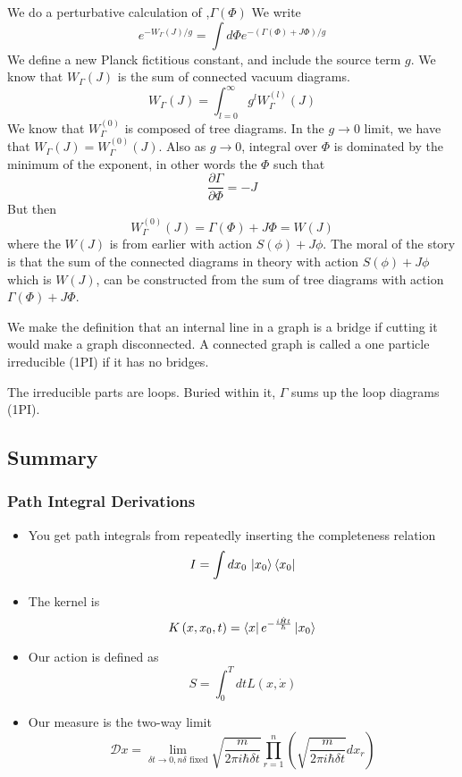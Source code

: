 \documentclass[11pt, oneside]{article}   	%
\theoremstyle{slanted}
\newcommand{\planck}{\hbar}
\begin{document}
We do a perturbative calculation of ,$ \Gamma \left(  \Phi   \right) $
We write 
\[
	e ^{  - W _{ \Gamma } \left( J  \right)   / g }  = \int d \Phi e ^{ 
	- \left( \Gamma \left(  \Phi  \right)   + J \Phi  \right)   / g } 
\] We define a new Planck fictitious constant, 
and include the source term $ g $. 
We know that 
$ W _{ \Gamma } \left(  J  \right)  $ is the 
sum of connected vacuum diagrams. 
\[
	W _{\Gamma }\left( J  \right) 
	= \int_{ l  =0 } ^{ \infty } g ^ l W _{ \Gamma } ^{ \left(  l  \right)   } 
	\left( J  \right) 
\]  We know that 
$ W  _{ \Gamma } ^{ \left(  0  \right)   }$ 
is composed of tree diagrams. 
In the $ g \to 0 $ limit, 
we have that $ W_{ \Gamma } \left( J  \right)    =  W_{ \Gamma } ^{ \left(  0  \right)  } 
\left( J  \right)  $. 
Also as $ g \to 0 $, integral over $ \Phi $ is 
dominated by the minimum of the exponent, 
in other words the $ \Phi $ such that 
\[
 \frac{\partial  \Gamma }{\partial  \Phi }   =  - J 
\]  But then 
\[
	W _{ \Gamma } ^{ \left(  0  \right)  } \left(  J \right)   = 
	\Gamma ( \Phi ) + J \Phi  = W \left( J  \right)  
\] where the $ W ( J ) $ is from earlier 
with action  $ S ( \phi  )  + J \phi  $. 
The moral of the 
story is that the sum of the connected diagrams 
in theory with action $ S( \phi  ) + J \phi  $ 
which is  $ W( J  )  $, can 
be constructed from the sum of tree diagrams with action  $ \Gamma \left( \Phi  \right)  
+ J \Phi $.

We make the definition that an internal line in  a graph 
is a bridge if cutting it 
would make a graph disconnected. 
A connected graph is called a 
one particle irreducible (1PI)
if it has no bridges. 

The irreducible parts are loops. 
Buried within it, 
$ \Gamma $ sums up the loop diagrams (1PI). 

\subsection*{Summary}

\subsubsection{Path Integral Derivations}
\begin{itemize}
	\item You get path integrals from repeatedly inserting 
		the completeness relation 
		\[
		 I = \int dx_0 \, \ket{x_0 }\bra{ x_0 } 
		\]
	\item The kernel is 
		\[
		 K \left( x, x_0 ,t   \right)   = \bra{x}e^{ -\frac{i \hat{H } t }{ \planck}}\ket{ x_0}
		\] 
	\item Our action is defined as 
		\[
			S  = \int_{ 0 } ^ T dt L \left(  x , \dot{ x }  \right) 
		\] 
	\item Our measure is the two-way limit 
		\[
			\mathcal{ D } x  = \lim_{ \delta t \to 0 , n \delta \text{ fixed}} 
			\sqrt{\frac{m}{ 2 \pi i \planck \delta t } }  \prod_{ r  = 1 } ^ n 
			\left( \sqrt{  \frac{m  }{2 \pi i \planck \delta t  }} dx _r  \right) 
		\] 
\end{itemize}
\end{document}
